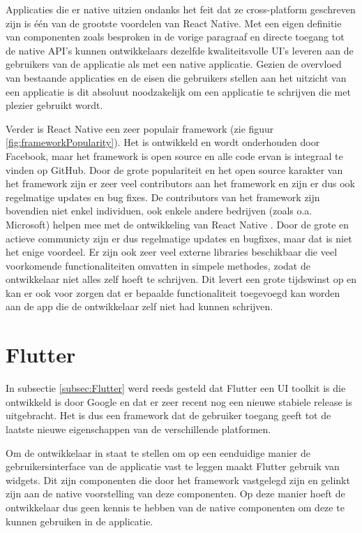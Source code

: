 Applicaties die er native uitzien ondanks het feit dat ze cross-platform geschreven zijn is één van de grootste voordelen van React Native. Met een eigen definitie van componenten zoals besproken in de vorige paragraaf en directe toegang tot de native API's kunnen ontwikkelaars dezelfde kwaliteitsvolle UI's leveren aan de gebruikers van de applicatie als met een native applicatie. Gezien de overvloed van bestaande applicaties en de eisen die gebruikers stellen aan het uitzicht van een applicatie is dit absoluut noodzakelijk om een applicatie te schrijven die met plezier gebruikt wordt.

Verder is React Native een zeer populair framework (zie figuur \ref{fig:frameworkPopularity}). Het is ontwikkeld en wordt onderhouden door Facebook, maar het framework is open source en alle code ervan is integraal te vinden op GitHub. Door de grote populariteit en het open source karakter van het framework zijn er zeer veel contributors aan het framework en zijn er dus ook regelmatige updates en bug fixes. De contributors van het framework zijn bovendien niet enkel individuen, ook enkele andere bedrijven (zoals o.a. Microsoft) helpen mee met de ontwikkeling van React Native \autocite{Nakazawa2019}. Door de grote en actieve communicty zijn er dus regelmatige updates en bugfixes, maar dat is niet het enige voordeel. Er zijn ook zeer veel externe libraries beschikbaar die veel voorkomende functionaliteiten omvatten in simpele methodes, zodat de ontwikkelaar niet alles zelf hoeft te schrijven. Dit levert een grote tijdswinst op en kan er ook voor zorgen dat er bepaalde functionaliteit toegevoegd kan worden aan de app die de ontwikkelaar zelf niet had kunnen schrijven.


\section{Flutter}
\label{detailsFlutter}

In subsectie \ref{subsec:Flutter} werd reeds gesteld dat Flutter een UI toolkit is die ontwikkeld is door Google en dat er zeer recent nog een nieuwe stabiele release is uitgebracht. Het is dus een framework dat de gebruiker toegang geeft tot de laatste nieuwe eigenschappen van de verschillende platformen.

Om de ontwikkelaar in staat te stellen om op een eenduidige manier de gebruikersinterface van de applicatie vast te leggen maakt Flutter gebruik van widgets. Dit zijn componenten die door het framework vastgelegd zijn en gelinkt zijn aan de native voorstelling van deze componenten. Op deze manier hoeft de ontwikkelaar dus geen kennis te hebben van de native componenten om deze te kunnen gebruiken in de applicatie. 

